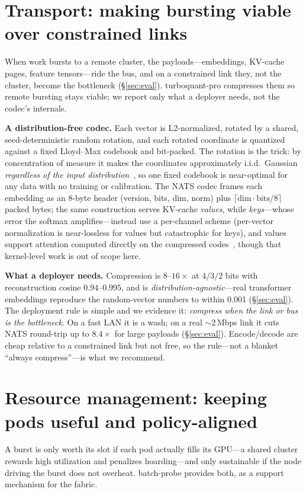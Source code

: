 \documentclass[conference]{IEEEtran}
\begin{document}
\section{Transport: making bursting viable over constrained links}\label{sec:tq}
When work bursts to a remote cluster, the payloads---embeddings, KV-cache pages, feature
tensors---ride the bus, and on a constrained link they, not the cluster, become the bottleneck
(\S\ref{sec:eval}). turboquant-pro compresses them so remote bursting stays viable; we report only
what a deployer needs, not the codec's internals.

\textbf{A distribution-free codec.} Each vector is L2-normalized, rotated by a shared,
seed-deterministic random rotation, and each rotated coordinate is quantized against a fixed
Lloyd--Max codebook and bit-packed. The rotation is the trick: by concentration of measure it
makes the coordinates approximately i.i.d.\ Gaussian \emph{regardless of the input
distribution}~\cite{turboquant}, so one fixed codebook is near-optimal for any data with no
training or calibration. The NATS codec frames each embedding as an 8-byte header (version, bits,
dim, norm) plus $\lceil\text{dim}\cdot\text{bits}/8\rceil$ packed bytes; the same construction
serves KV-cache \emph{values}, while \emph{keys}---whose error the softmax amplifies---instead use a
per-channel scheme (per-vector normalization is near-lossless for values but catastrophic for keys),
and values support attention computed directly on the compressed
codes~\cite{onlinesoftmax,flashattention}, though that kernel-level work is out of scope here.

\textbf{What a deployer needs.} Compression is $8$--$16\times$ at $4/3/2$ bits with reconstruction
cosine $0.94$--$0.995$, and is \emph{distribution-agnostic}---real transformer embeddings reproduce
the random-vector numbers to within 0.001 (\S\ref{sec:eval}). The deployment rule is simple and we
evidence it: \emph{compress when the link or bus is the bottleneck}. On a fast LAN it is a wash; on
a real $\sim$2\,Mbps link it cuts NATS round-trip up to $8.4\times$ for large payloads
(\S\ref{sec:eval}). Encode/decode are cheap relative to a constrained link but not free, so the
rule---not a blanket ``always compress''---is what we recommend.

\section{Resource management: keeping pods useful and policy-aligned}\label{sec:bp}
A burst is only worth its slot if each pod actually fills its GPU---a shared cluster rewards high
utilization and penalizes hoarding---and only sustainable if the node driving the burst does not
overheat. batch-probe provides both, as a support mechanism for the fabric.
\end{document}
